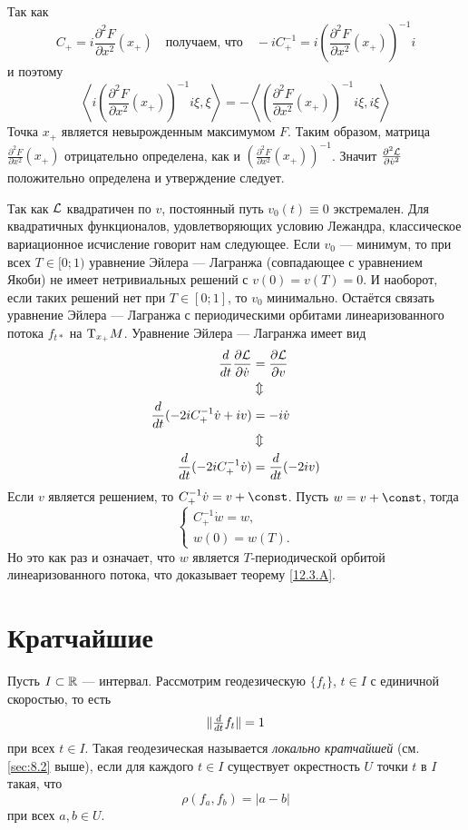 Так как 
\[C_+=i\frac{\partial^2F}{\partial x^2}(x_+)
\quad\text{получаем, что}\quad
-iC_+^{-1}=i\left(\frac{\partial^2F}{\partial x^2}(x_+)\right)^{-1}i\]
и поэтому 
\[
\left\langle i\left(\frac{\partial^2F}{\partial x^2}(x_+)\right)^{-1}i\xi,\xi\right\rangle
=
-\left\langle \left(\frac{\partial^2F}{\partial x^2}(x_+)\right)^{-1}i\xi,i\xi\right\rangle
\]
Точка $x_+$ является невырожденным максимумом $F$.
Таким образом, матрица $\frac{\partial^2F}{\partial x^2}(x_+)$
отрицательно определена, как и $\left(\frac{\partial^2F}{\partial x^2}(x_+)\right)^{-1}$.
Значит $\tfrac{\partial^2\mathcal{L}}{\partial\dot v^2}$ положительно определена и утверждение следует.

Так как $\mathcal{L}$ квадратичен по $v$, постоянный путь $v_0(t) \equiv 0$ экстремален.
Для квадратичных функционалов, удовлетворяющих условию Лежандра, классическое вариационное исчисление говорит нам следующее.
Если $v_0$ --- минимум, то при всех $T \in [0;1)$ уравнение Эйлера --- Лагранжа (совпадающее с уравнением Якоби) не имеет нетривиальных решений с $v(0) = v(T) = 0$.
И наоборот, если таких решений нет при $T\in[0;1]$, то $v_0$ минимально.
Остаётся связать уравнение Эйлера --- Лагранжа с периодическими орбитами линеаризованного потока $f_{t*}$ на $\mathrm{T}_{x_+}M$.
Уравнение Эйлера --- Лагранжа имеет вид
\begin{align*}
\frac{d}{d t}\frac{\partial \mathcal{L}}{\partial \dot v}
&=\frac{\partial \mathcal{L}}{\partial v}
\\
&\Updownarrow
\\
\frac{d}{d t}(-2iC_+^{-1}\dot v+iv)
&=-i\dot v
\\
&\Updownarrow
\\
\frac{d}{d t}(-2iC_+^{-1}\dot v)
&=
\frac{d}{d t}(-2iv)
\end{align*}
Если $v$ является решением, то $C_+^{-1}\dot v = v + \const$.
Пусть $w = v + \const$, тогда 
\[
\begin{cases}
C_+^{-1}\dot w=w,
\\
w(0)=w(T).
\end{cases}
\]
Но это как раз и означает, что $w$ является $T$-периодической орбитой линеаризованного потока, что доказывает теорему \ref{12.3.A}.
\qeds


\section{Кратчайшие}
Пусть $I \subset \mathbb{R}$ --- интервал.
Рассмотрим геодезическую $\{f_t\}$, $t\in I$ с единичной скоростью, то есть
\[\|\tfrac{d}{d t}f_t\|=1\]
при всех $t\in I$.
Такая геодезическая называется \emph{локально кратчайшей} (см. \ref{sec:8.2} выше), если для каждого $t\in I$ существует окрестность $U$ точки $t$ в $I$ такая, что 
\[\rho(f_a,f_b)=|a-b|\]
при всех $a,b\in U$.


